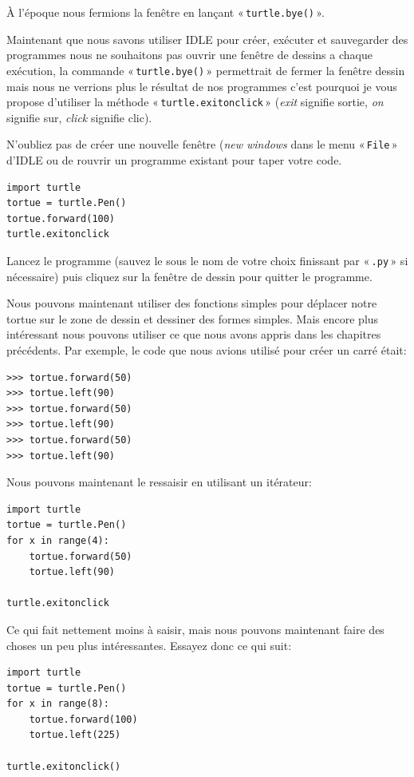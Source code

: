 À l'époque nous fermions la fenêtre en lançant « \texttt{turtle.bye()} ».

Maintenant que nous savons utiliser IDLE pour créer, exécuter et sauvegarder des programmes nous ne souhaitons pas ouvrir une  fenêtre de dessins a chaque exécution, la commande « \texttt{turtle.bye()} » permettrait de fermer la fenêtre dessin mais nous ne verrions plus le résultat de nos programmes c'est pourquoi je vous propose d'utiliser 
la méthode « \texttt{turtle.exitonclick} »  (\emph{exit} signifie sortie, \emph{on} signifie sur, \emph{click} signifie clic).

N'oubliez pas de créer une nouvelle fenêtre (\emph{new windows} dans le menu « \texttt{File} » d'IDLE ou de rouvrir un programme existant pour taper votre code.

\begin{Verbatim}[frame=single,rulecolor=\color{mbleu}, label=à taper]
import turtle
tortue = turtle.Pen()
tortue.forward(100)
turtle.exitonclick
\end{Verbatim}

Lancez le programme (sauvez le sous le nom de votre choix finissant par « \texttt{.py} » si nécessaire) puis cliquez sur la fenêtre de dessin pour quitter le programme.

Nous pouvons maintenant utiliser des fonctions simples pour déplacer notre tortue sur le zone de dessin et dessiner des formes simples. Mais encore plus intéressant nous pouvons utiliser ce que nous avons appris dans les chapitres précédents. Par exemple, le code que nous avions utilisé pour créer un carré était:

\begin{Verbatim}[frame=single,rulecolor=\color{gray}, label=ne pas saisir]
>>> tortue.forward(50)
>>> tortue.left(90)
>>> tortue.forward(50)
>>> tortue.left(90)
>>> tortue.forward(50)
>>> tortue.left(90)
\end{Verbatim}

Nous pouvons maintenant le ressaisir en utilisant un itérateur:

\begin{Verbatim}[frame=single,rulecolor=\color{mbleu}, label=à taper]
import turtle
tortue = turtle.Pen()
for x in range(4):
    tortue.forward(50)
    tortue.left(90)
    
turtle.exitonclick
\end{Verbatim}

Ce qui fait nettement moins à saisir, mais nous pouvons maintenant faire des choses un peu plus intéressantes. Essayez donc ce qui suit:
\begin{Verbatim}[frame=single,rulecolor=\color{mbleu}, label=à taper]
import turtle
tortue = turtle.Pen()
for x in range(8):
    tortue.forward(100)
    tortue.left(225)
    
turtle.exitonclick()
\end{Verbatim}

